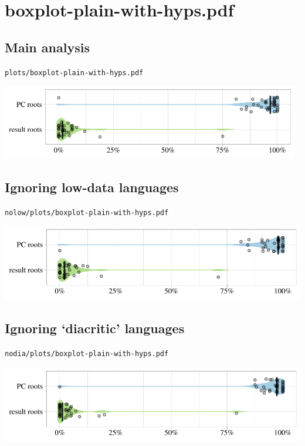 \eject

\section{boxplot-plain-with-hyps.pdf}

\subsection{Main analysis}

\texttt{plots/boxplot-plain-with-hyps.pdf}

\includegraphics[width=0.98\textwidth]{../plots/boxplot-plain-with-hyps.pdf}

\subsection{Ignoring low-data languages}

\texttt{nolow/plots/boxplot-plain-with-hyps.pdf}

\includegraphics[width=1.0\textwidth]{../nolow/plots/boxplot-plain-with-hyps.pdf}

\subsection{Ignoring `diacritic' languages}

\texttt{nodia/plots/boxplot-plain-with-hyps.pdf}

\includegraphics[width=1.0\textwidth]{../nodia/plots/boxplot-plain-with-hyps.pdf}

